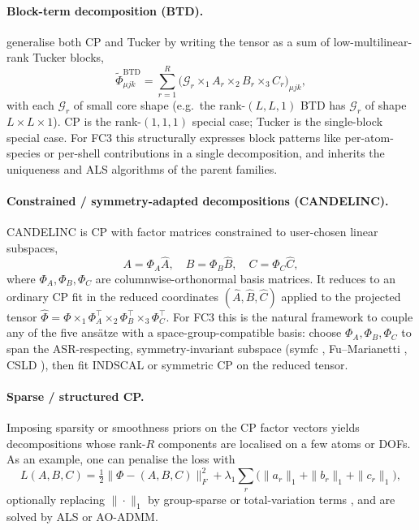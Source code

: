 \paragraph{Block-term decomposition (BTD).} \citet{de_lathauwer_decompositions_2008, de_lathauwer_decompositions_2008-1}
generalise both CP and Tucker by writing the tensor as a sum of low-multilinear-rank Tucker blocks,
\begin{equation}
  \tilde\Phi_{\mu j k}^{\mathrm{BTD}}
  = \sum_{r=1}^{R}\bigl(\mathcal{G}_r\times_1 A_r\times_2 B_r\times_3 C_r\bigr)_{\mu j k},
\end{equation}
with each $\mathcal{G}_r$ of small core shape (e.g.\ the rank-$(L,L,1)$ BTD has
$\mathcal{G}_r$ of shape $L\times L\times 1$). CP is the rank-$(1,1,1)$ special case; Tucker is
the single-block special case. For FC3 this structurally expresses block patterns like
per-atom-species or per-shell contributions in a single decomposition, and inherits the
uniqueness and ALS algorithms of the parent families.

\paragraph{Constrained / symmetry-adapted decompositions (CANDELINC).} CANDELINC
\cite{carroll_candelinc_1980} is CP with factor matrices constrained to user-chosen
linear subspaces,
\begin{equation}
  A=\Phi_A\hat A,\quad B=\Phi_B\hat B,\quad C=\Phi_C\hat C,
\end{equation}
where $\Phi_A,\Phi_B,\Phi_C$ are columnwise-orthonormal basis matrices. It reduces to an ordinary
CP fit in the reduced coordinates $(\hat A,\hat B,\hat C)$ applied to the projected tensor
$\hat\Phi = \Phi\times_1\Phi_A^\top\times_2\Phi_B^\top\times_3\Phi_C^\top$. For FC3 this is the
natural framework to couple any of the five ans\"atze with a space-group-compatible basis:
choose $\Phi_A,\Phi_B,\Phi_C$ to span the ASR-respecting, symmetry-invariant subspace (symfc
\cite{seko_projector-based_2024}, Fu--Marianetti \cite{fu_group_2019}, CSLD
\cite{zhou_lattice_2014, zhou_compressive_2019}), then fit INDSCAL or symmetric CP on the reduced
tensor.

\paragraph{Sparse / structured CP.} Imposing sparsity or smoothness priors on the CP factor
vectors yields decompositions whose rank-$R$ components are localised on a few atoms or DOFs.
As an example, one can penalise the loss with
\begin{equation}
  L(A,B,C) = \tfrac12\|\Phi - ( A,B,C)\|_{F}^{2}
            + \lambda_1\sum_r\bigl(\|a_r\|_1+\|b_r\|_1+\|c_r\|_1\bigr),
\end{equation}
optionally replacing $\|\cdot\|_1$ by group-sparse or total-variation terms
\cite{papalexakis_parcube_2012, kim_sparse_2007}, and are solved by
ALS or AO-ADMM.

